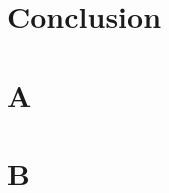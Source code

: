 \documentclass{article}
\theoremstyle{definition}
\numberwithin{equation}{section} %
\begin{document}
\section{Conclusion} 
    

\printbibliography[title={Works Referenced}]

\appendix
    \setcounter{section}{0}
    \renewcommand{\thesection}{\Alph{section}.}
    \renewcommand{\thesubsection}{\alph{section}(\roman{subsection})}
    
    \section{A} \label{Appendix A}
    	
        
    \section{B} \label{Appendix B}
    	
\end{document}
